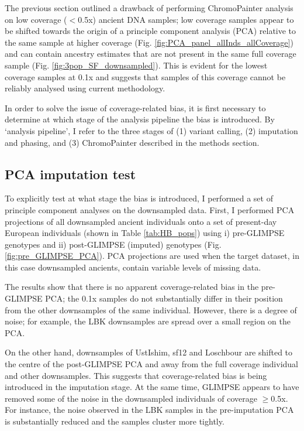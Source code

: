 The previous section outlined a drawback of performing ChromoPainter analysis on low coverage ($<$0.5x) ancient DNA samples; low coverage samples appear to be shifted towards the origin of a principle component analysis (PCA) relative to the same sample at higher coverage (Fig. \ref{fig:PCA_panel_allInds_allCoverage}) and can contain ancestry estimates that are not present in the same full coverage sample (Fig. \ref{fig:3pop_SF_downsampled}).  This is evident for the lowest coverage samples at 0.1x and suggests that samples of this coverage cannot be reliably analysed using         current methodology.

In order to solve the issue of coverage-related bias, it is first necessary to determine at which stage of the analysis pipeline the bias is introduced. By `analysis pipeline', I refer to the three stages of (1) variant calling, (2) imputation and phasing, and (3) ChromoPainter described in the methods section.

\subsection{PCA imputation test} \label{sec:PCAImputationTest}

To explicitly test at what stage the bias is introduced, I performed a set of principle component analyses on the downsampled data. First, I performed PCA projections of all downsampled ancient individuals onto a set of present-day European individuals (shown in Table \ref{tab:HB_pops}) using i) pre-GLIMPSE genotypes and ii) post-GLIMPSE (imputed) genotypes (Fig. \ref{fig:pre_GLIMPSE_PCA}). PCA projections are used when the target dataset, in this case downsampled ancients, contain variable levels of missing data.  

The results show that there is no apparent coverage-related bias in the pre-GLIMPSE PCA; the 0.1x samples do not substantially differ in their position from the other downsamples of the same individual. However, there is a degree of noise; for example, the LBK downsamples are spread over a small region on the PCA. 

On the other hand, downsamples of UstIshim, sf12 and Loschbour are shifted to the centre of the post-GLIMPSE PCA and away from the full coverage individual and other downsamples. This suggests that coverage-related bias is being introduced in the imputation stage. At the same time, GLIMPSE appears to have removed some of the noise in the downsampled individuals of coverage $\geq$0.5x. For instance, the noise observed in the LBK samples in the pre-imputation PCA is substantially reduced and the samples cluster more tightly.  

